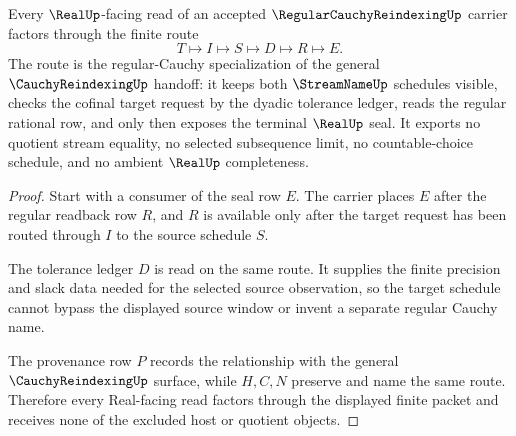 \begin{theorem}
\label{thm:regular-cauchy-reindexing-real-seal-route}
Every $\RealUp$-facing read of an accepted $\RegularCauchyReindexingUp$ carrier factors through the finite route
$$
T \longmapsto I \longmapsto S \longmapsto D \longmapsto R \longmapsto E .
$$
The route is the regular-Cauchy specialization of the general $\CauchyReindexingUp$ handoff: it keeps both $\StreamNameUp$ schedules visible, checks the cofinal target request by the dyadic tolerance ledger, reads the regular rational row, and only then exposes the terminal $\RealUp$ seal. It exports no quotient stream equality, no selected subsequence limit, no countable-choice schedule, and no ambient $\RealUp$ completeness.
\end{theorem}
\begin{proof}
Start with a consumer of the seal row $E$. The carrier places $E$ after the regular readback row $R$, and $R$ is available only after the target request has been routed through $I$ to the source schedule $S$.

The tolerance ledger $D$ is read on the same route. It supplies the finite precision and slack data needed for the selected source observation, so the target schedule cannot bypass the displayed source window or invent a separate regular Cauchy name.

The provenance row $P$ records the relationship with the general $\CauchyReindexingUp$ surface, while $H,C,N$ preserve and name the same route. Therefore every Real-facing read factors through the displayed finite packet and receives none of the excluded host or quotient objects.
\end{proof}

